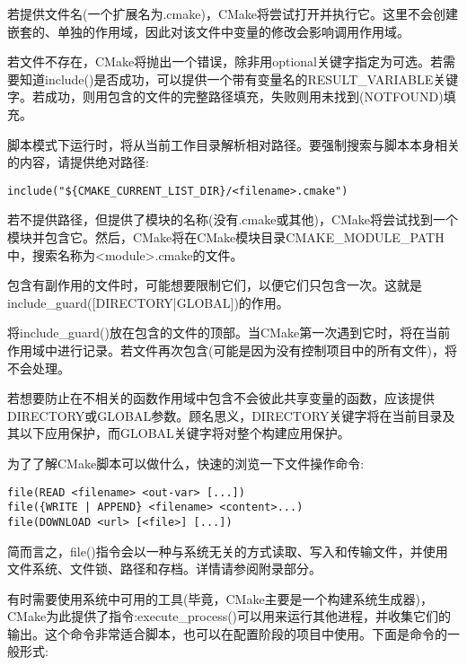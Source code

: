 若提供文件名(一个扩展名为.cmake)，CMake将尝试打开并执行它。这里不会创建嵌套的、单独的作用域，因此对该文件中变量的修改会影响调用作用域。

若文件不存在，CMake将抛出一个错误，除非用optional关键字指定为可选。若需要知道include()是否成功，可以提供一个带有变量名的RESULT\_VARIABLE关键字。若成功，则用包含的文件的完整路径填充，失败则用未找到(NOTFOUND)填充。

脚本模式下运行时，将从当前工作目录解析相对路径。要强制搜索与脚本本身相关的内容，请提供绝对路径:

\begin{lstlisting}[style=styleCMake]
include("${CMAKE_CURRENT_LIST_DIR}/<filename>.cmake")
\end{lstlisting}

若不提供路径，但提供了模块的名称(没有.cmake或其他)，CMake将尝试找到一个模块并包含它。然后，CMake将在CMake模块目录CMAKE\_MODULE\_PATH中，搜索名称为<module>.cmake的文件。


包含有副作用的文件时，可能想要限制它们，以便它们只包含一次。这就是include\_guard([DIRECTORY|GLOBAL])的作用。

将include\_guard()放在包含的文件的顶部。当CMake第一次遇到它时，将在当前作用域中进行记录。若文件再次包含(可能是因为没有控制项目中的所有文件)，将不会处理。

若想要防止在不相关的函数作用域中包含不会彼此共享变量的函数，应该提供DIRECTORY或GLOBAL参数。顾名思义，DIRECTORY关键字将在当前目录及其以下应用保护，而GLOBAL关键字将对整个构建应用保护。


为了了解CMake脚本可以做什么，快速的浏览一下文件操作命令:

\begin{lstlisting}[style=styleCMake]
file(READ <filename> <out-var> [...])
file({WRITE | APPEND} <filename> <content>...)
file(DOWNLOAD <url> [<file>] [...])
\end{lstlisting}

简而言之，file()指令会以一种与系统无关的方式读取、写入和传输文件，并使用文件系统、文件锁、路径和存档。详情请参阅附录部分。


有时需要使用系统中可用的工具(毕竟，CMake主要是一个构建系统生成器)，CMake为此提供了指令:execute\_process()可以用来运行其他进程，并收集它们的输出。这个命令非常适合脚本，也可以在配置阶段的项目中使用。下面是命令的一般形式:

